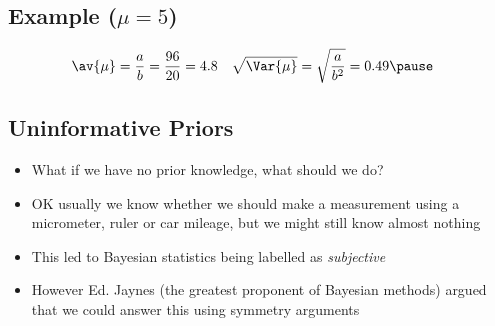 
\begin{slide}
\section[-2]{Example ($\mu=5$)}
\pb
\pause{}
\begin{center}
  \pause
\end{center}
\vspace*{-1cm}
\begin{align*}
  \av{\mu} &= \frac{a}{b} = \frac{96}{20} = 4.8 &
  \sqrt{\Var{\mu}} &=  \sqrt{\frac{a}{b^2}} = 0.49\pause
\end{align*}
\end{slide}

\Outline

\begin{slide}
\section{Uninformative Priors}

\begin{PauseHighLight}
  \begin{itemize}
  \item What if we have no prior knowledge, what should we do?\pause
  \item OK usually we know whether we should make a measurement using a
    micrometer, ruler or car mileage, but we might still know almost
    nothing\pause
  \item This led to Bayesian statistics being labelled as
    \textit{subjective}\pause
  \item However Ed. Jaynes (the greatest proponent of Bayesian methods)
    argued that we could answer this using symmetry arguments\pause
  \end{itemize}
\end{PauseHighLight}

\end{slide}



